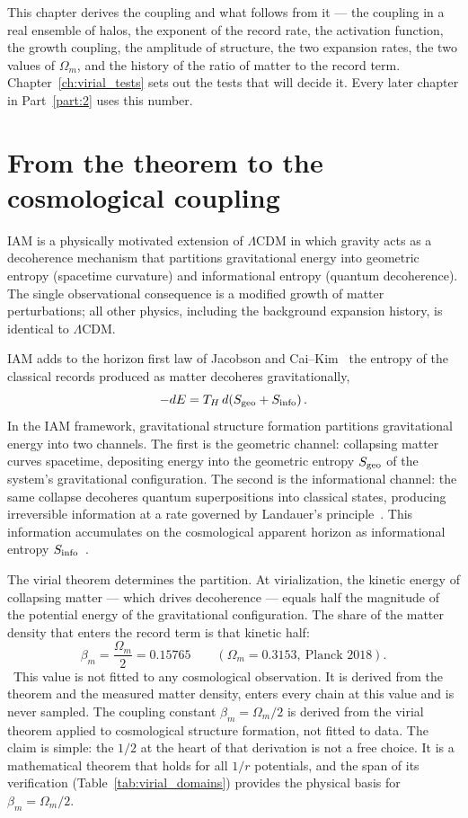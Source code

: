 This chapter derives the coupling and what follows from it --- the coupling in a real ensemble of halos, the exponent of the record rate, the activation
function, the growth coupling, the amplitude of structure, the two expansion rates, the two values of $\Omega_m$, and the history of the ratio of matter to
the record term. Chapter~\ref{ch:virial_tests} sets out the tests that will decide it. Every later chapter in Part~\ref{part:2} uses this number.

\section{From the theorem to the cosmological coupling}\label{sec:vc_coupling}
IAM is a physically motivated extension of $\Lambda$CDM in which gravity acts as a decoherence mechanism that partitions
gravitational energy into geometric entropy (spacetime curvature) and informational entropy (quantum decoherence). The single observational consequence is a
modified growth of matter perturbations; all other physics, including the background expansion history, is identical to $\Lambda$CDM.

IAM adds to the horizon first law of Jacobson and Cai--Kim~\cite{Jacobson1995,CaiKim2005} the entropy of the classical records produced as matter decoheres
gravitationally,
\begin{equation}
-dE=T_H\,d\!\left(S_{\rm geo}+S_{\rm info}\right).\label{eq:vc_firstlaw}
\end{equation}
In the IAM framework, gravitational structure formation partitions gravitational energy into two channels. The first is the geometric channel: collapsing
matter curves spacetime, depositing energy into the geometric entropy $S_{\rm geo}$ of the system's gravitational configuration. The second is the
informational channel: the same collapse decoheres quantum superpositions into classical states, producing irreversible information at a rate governed by
Landauer's principle~\cite{Landauer1961}. This information accumulates on the cosmological apparent horizon as informational entropy $S_{\rm info}$~\cite{Jacobson1995,CaiKim2005}.

The virial theorem determines the partition. At virialization, the kinetic energy of collapsing matter --- which drives decoherence --- equals half the
magnitude of the potential energy of the gravitational configuration. The share of the matter density that enters the record term is that kinetic half:
\begin{equation}
\beta_m=\frac{\Omega_m}{2}=0.15765\qquad(\Omega_m=0.3153,\ \text{Planck 2018}).\label{eq:vc_beta}
\end{equation}
\prediction\ This value is not fitted to any cosmological observation. It is derived from the theorem and the measured matter density, enters every chain at
this value and is never sampled. The coupling constant $\beta_m=\Omega_m/2$ is derived from the virial theorem applied to cosmological structure formation,
not fitted to data. The claim is simple: the $1/2$ at the heart of that derivation is not a free choice. It is a mathematical theorem that holds for all $1/r$
potentials, and the span of its verification (Table~\ref{tab:virial_domains}) provides the physical basis for $\beta_m=\Omega_m/2$.

